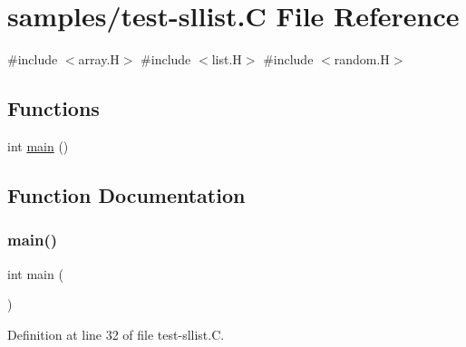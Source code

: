 \hypertarget{test-sllist_8_c}{}\section{samples/test-\/sllist.C File Reference}
\label{test-sllist_8_c}
{\ttfamily \#include $<$array.\+H$>$}\newline
{\ttfamily \#include $<$list.\+H$>$}\newline
{\ttfamily \#include $<$random.\+H$>$}\newline
\subsection*{Functions}
\begin{DoxyCompactItemize}
\item 
int \hyperlink{test-sllist_8_c_ae66f6b31b5ad750f1fe042a706a4e3d4}{main} ()
\end{DoxyCompactItemize}


\subsection{Function Documentation}
\mbox{\label{test-sllist_8_c_ae66f6b31b5ad750f1fe042a706a4e3d4}} 
\subsubsection{\texorpdfstring{main()}{main()}}
{\footnotesize\ttfamily int main (\begin{DoxyParamCaption}{ }\end{DoxyParamCaption})}



Definition at line 32 of file test-\/sllist.\+C.

